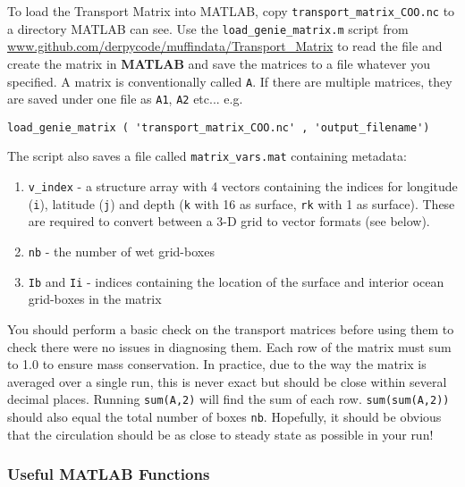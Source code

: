 To load the Transport Matrix into MATLAB, copy \texttt{transport\_matrix\_COO.nc} to a directory MATLAB can see. Use the  \texttt{load\_genie\_matrix.m}  script from \url{www.github.com/derpycode/muffindata/Transport_Matrix} to read the file and create the matrix in \textbf{MATLAB} and save the matrices to a file  whatever you specified. A matrix is conventionally called \texttt{A}. If there are multiple matrices, they are saved under one file as \texttt{A1}, \texttt{A2} etc... e.g.
\vspace{-1mm}\small\begin{verbatim}
load_genie_matrix ( 'transport_matrix_COO.nc' , 'output_filename')
\end{verbatim}\normalsize\vspace{-1mm}
\noindent The script also saves a file called \texttt{matrix\_vars.mat} containing metadata:

\vspace{2mm}
\begin{enumerate}
\item \texttt{v\_index} - a structure array with 4 vectors containing the indices for longitude (\texttt{i}), latitude (\texttt{j}) and depth (\texttt{k} with 16 as surface, \texttt{rk} with 1 as surface). These are required to convert between a 3-D grid to vector formats (see below).
\item \texttt{nb} - the number of wet grid-boxes
\item \texttt{Ib} and \texttt{Ii} - indices containing the location of the surface and interior ocean grid-boxes in the matrix
\end{enumerate}
\vspace{2mm}

You should perform a basic check on the transport matrices before using them to check there were no issues in diagnosing them. Each row of the matrix must sum to 1.0 to ensure mass conservation. In practice, due to the way the matrix is averaged over a single run, this is never exact but should be close within several decimal places. Running \texttt{sum(A,2)} will find the sum of each row. \texttt{sum(sum(A,2))} should also equal the total number of boxes \texttt{nb}. Hopefully, it should be obvious that the circulation should be as close to steady state as possible in your run!

%
\subsubsection{Useful MATLAB Functions}
\vspace{1mm}

